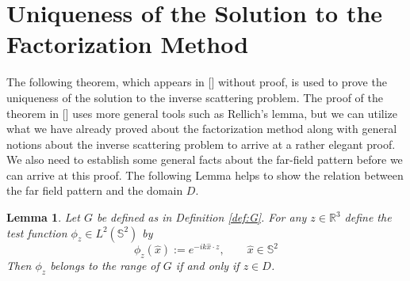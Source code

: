 \documentclass[]{article}
\newtheorem{lemma}{Lemma}
\newcommand{\R}{\mathbb R}
\renewcommand{\S}{\mathbb S}
\begin{document}
		\section{Uniqueness of the Solution to the Factorization Method}
			The following theorem, which appears in [\cite{kirschgrinberg2008}] without proof, is used to prove the uniqueness of the solution to the inverse scattering problem. The proof of the theorem in [\cite{coltonkress2013}] uses more general tools such as Rellich's lemma, but we can utilize what we have already proved about the factorization method along with general notions about the inverse scattering problem to arrive at a rather elegant proof. We also need to establish some general facts about the far-field pattern before we can arrive at this proof. The following Lemma helps to show the relation between the far field pattern and the domain $D$.
			\begin{lemma}\label{lemma:test-function}
				Let $G$ be defined as in Definition \ref{def:G}. For any $z\in \R^3$ define the test function $\phi_z \in L^2(\S^2)$ by 
				\begin{equation}
					\phi_z(\hat x) := e^{-ik\hat x\cdot z}, \qquad \hat x\in \S^2
				\end{equation}
				Then $\phi_z$ belongs to the range of $G$ if and only if $z\in D$.
			\end{lemma}
\end{document}
